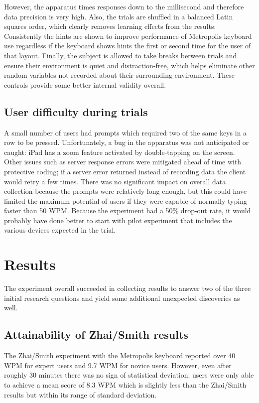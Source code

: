 \documentclass[english]{vgtc}
\begin{document}
However, the apparatus times responses down to the millisecond and therefore data precision is very high.
Also, the trials are shuffled in a balanced Latin squares order, which clearly removes learning effects
from the results: Consistently the hints are shown to improve performance of Metropolis keyboard use regardless
if the keyboard shows hints the first or second time for the user of that layout. Finally, the subject is
allowed to take breaks between trials and ensure their environment is quiet and distraction-free, which helps
eliminate other random variables not recorded about their surrounding environment. These controls provide
some better internal validity overall.
\subsection{User difficulty during trials}
A small number of users had prompts which required two of the same keys in a row to be pressed.
Unfortunately, a bug in the apparatus was not anticipated or caught: iPad has a zoom feature activated
by double-tapping on the screen.  Other issues such as server response errors were mitigated ahead of time
with protective coding; if a server error returned instead of recording data the client would retry a few times.
There was no significant impact on overall data collection because the prompts were relatively long enough,
but this could have limited the maximum potential of users if they were capable of normally typing faster than 50 WPM.
Because the experiment had a 50\% drop-out rate, it would probably have done better to start with pilot experiment
that includes the various devices expected in the trial.
\section{Results}

The experiment overall succeeded in collecting results to answer two of the three initial research questions and
yield some additional unexpected discoveries as well.

\subsection{Attainability of Zhai/Smith results}

The Zhai/Smith experiment with the Metropolis keyboard reported over 40 WPM for expert users and 9.7 WPM for novice users.
However, even after roughly 30 minutes there was no sign of statistical deviation: users were only able to achieve a
mean score of 8.3 WPM which is slightly less than the Zhai/Smith results but within its range of standard deviation.  
\end{document}
